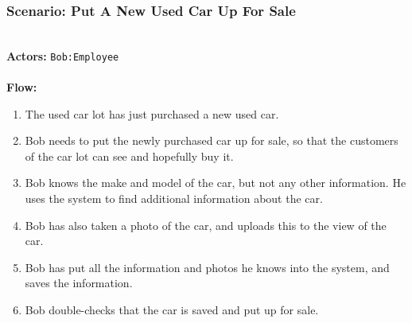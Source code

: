 \subsubsection{Scenario: Put A New Used Car Up For Sale}
\HRule \\[0.4cm]
\textbf{Actors:} \texttt{Bob:Employee}\\
\HRule \\[0.4cm]
\textbf{Flow:} \\
\begin{enumerate}
\item The used car lot has just purchased a new used car.
\item Bob needs to put the newly purchased car up for sale, so that the customers of the car lot can see and hopefully buy it.
\item Bob knows the make and model of the car, but not any other information. He uses the system to find additional information about the car. 
\item Bob has also taken a photo of the car, and uploads this to the view of the car. 
\item Bob has put all the information and photos he knows into the system, and saves the information. 
\item Bob double-checks that the car is saved and put up for sale.
\end{enumerate}
\HRule \\[0.4cm]
